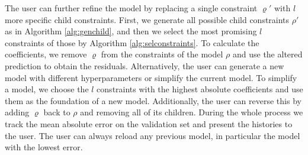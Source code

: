 The user can further refine the model by replacing a single constraint $\varrho'$ with $l$ more specific child constraints. First, we generate all possible child constraints $\rho'$ as in Algorithm \ref{alg:genchild}, and then we select the most promising $l$ constraints of those by Algorithm \ref{alg:selconstraints}. To calculate the coefficients,  we remove $\varrho$ from the constraints of the model $\rho$ and use the altered prediction to obtain the residuals. Alternatively, the user can generate a new model with different hyperparameters or simplify the current model. To simplify a model, we choose the $l$ constraints with the highest absolute coefficients and use them as the foundation of a new model. Additionally, the user can reverse this by adding $\varrho$ back to $\rho$ and removing all of its children. During the whole process we track the mean absolute error on the validation set and present the histories to the user. The user can always reload any previous model, in particular the model with the lowest error.


